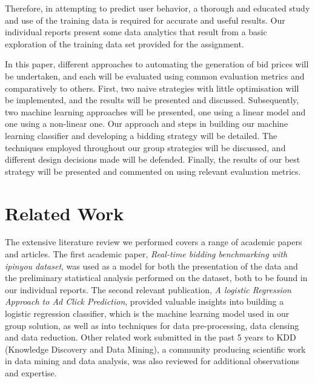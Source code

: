 \documentclass{sig-alternate-05-2015}
\begin{document}
Therefore, in attempting to predict user behavior, a thorough and educated study and use of the training data is required for accurate and useful results. Our individual reports present some data analytics that result from a basic exploration of the training data set provided for the assignment.

In this paper, different approaches to automating the generation of bid prices will be undertaken, and each will be evaluated using common evaluation metrics and comparatively to others. First, two naive strategies with little optimisation will be implemented, and the results will be presented and discussed. Subsequently, two machine learning approaches will be presented, one using a linear model and one using a non-linear one. Our approach and steps in building our machine learning classifier and developing a bidding strategy will be detailed. The techniques employed throughout our group strategies will be discussed, and different design decisions made will be defended. Finally, the results of our best strategy will be presented and commented on using relevant evaluation metrics.

\section{Related Work}
The extensive literature review we performed covers a range of academic papers and articles. The first academic paper, \textit{Real-time bidding benchmarking with ipinyou dataset}, was used as a model for both the presentation of the data and the preliminary statistical analysis performed on the dataset, both to be found in our individual reports. The second relevant publication, \textit{A logistic Regression Approach to Ad Click Prediction}, provided valuable insights into building a logistic regression classifier, which is the machine learning model used in our group solution, as well as into techniques for data pre-processing, data clensing and data reduction. Other related work submitted in the past 5 years to KDD (Knowledge Discovery and Data Mining), a community producing scientific work in data mining and data analysis, was also reviewed for additional observations and expertise.
\end{document}
